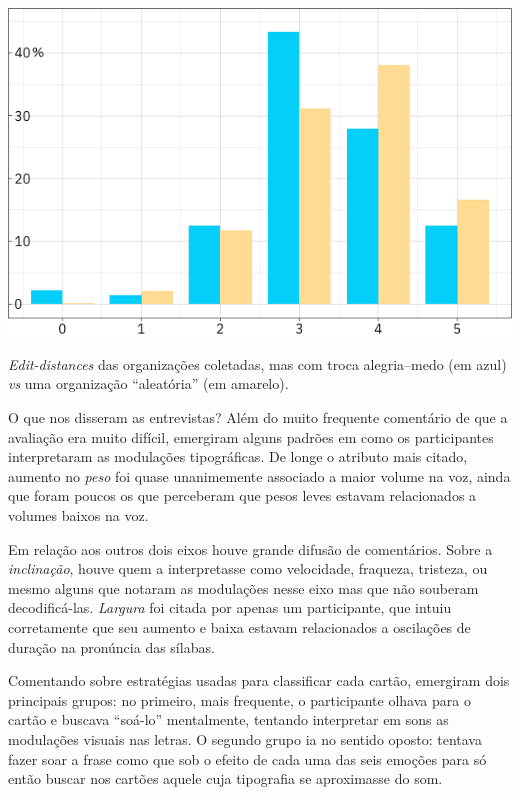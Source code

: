 \documentclass{tufte-handout}
\begin{document}
\begin{marginfigure}[0.5\baselineskip]
  \includegraphics{imgs/edit_distance_troca.png}
  \caption{\textit{Edit-distances} das organizações coletadas, mas com troca alegria--medo (em azul) \textit{vs} uma organização ``aleatória'' (em amarelo).}
  \label{edit_dist_2}
\end{marginfigure}

O que nos disseram as entrevistas? Além do muito frequente comentário de que a avaliação era muito difícil, emergiram alguns padrões em como os participantes interpretaram as modulações tipográficas. De longe o atributo mais citado, aumento no \textit{peso} foi quase unanimemente associado a maior volume na voz, ainda que foram poucos os que perceberam que pesos leves estavam relacionados a volumes baixos na voz.

Em relação aos outros dois eixos houve grande difusão de comentários. Sobre a \textit{inclinação}, houve quem a interpretasse como velocidade, fraqueza, tristeza, ou mesmo alguns que notaram as modulações nesse eixo mas que não souberam decodificá-las. \textit{Largura} foi citada por apenas um participante, que intuiu corretamente que seu aumento e baixa estavam relacionados a oscilações de duração na pronúncia das sílabas.

Comentando sobre estratégias usadas para classificar cada cartão, emergiram dois principais grupos: no primeiro, mais frequente, o participante olhava para o cartão e buscava ``soá-lo'' mentalmente, tentando interpretar em sons as modulações visuais nas letras. O segundo grupo ia no sentido oposto: tentava fazer soar a frase como que sob o efeito de cada uma das seis emoções para só então buscar nos cartões aquele cuja tipografia se aproximasse do som.
\end{document}
